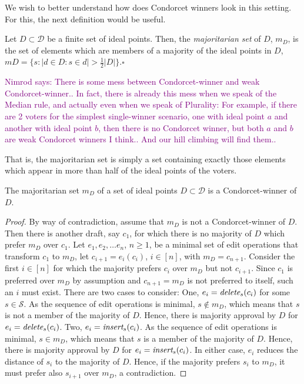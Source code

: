 \documentclass[sigconf]{aamas}  %
\newcommand{\nimrod}[1]{\textcolor{purple}{Nimrod says: #1}}
\newcommand{\qqed}{\hfill$\square$}
\newcommand{\calD}{\mathcal{D}}
\newcommand{\calS}{\mathcal{S}}
\newcommand{\iinsert}[1]{\emph{insert}_{#1}}
\newcommand{\ddelete}[1]{\emph{delete}_{#1}}
\begin{document}
We wish to better understand how does Condorcet winners look in this setting. For this, the next definition would be useful.

\begin{definition}\label{definition:majoritatian-set}
%
Let $D \subset \calD$ be a finite set of ideal points. Then, the \emph{majoritarian set} of $D$, $m_D$, is the set of elements which are members of a majority of the ideal points in $D$, $mD = \{s: |d \in D : s \in d| > \frac{1}{2}{|D|}\}$.\qqed
%
\end{definition}

\nimrod{There is some mess between Condorcet-winner and weak Condorcet-winner.. In fact, there is already this mess when we speak of the Median rule, and actually even when we speak of Plurality:
  For example, if there are 2 voters for the simplest single-winner scenario, one with ideal point $a$ and another with ideal point $b$, then there is no Condorcet winner, but both $a$ and $b$ are weak Condorcet winners I think.. And our hill climbing will find them..}

That is, the majoritarian set is simply a set containing exactly those elements which appear in more than half of the ideal points of the voters.

\begin{lemma}
\label{lemma:condorcet-majoritarian}
The majoritarian set $m_D$ of a set of ideal points $D \subset \calD$ is a Condorcet-winner of $D$.
\end{lemma}

\begin{proof}
%
By way of contradiction, assume that $m_D$ is not a Condorcet-winner of $D$.  Then there is another draft, say $c_1$, for which there is no majority of $D$ which prefer $m_D$ over $c_1$.  
Let $e_1, e_2, \ldots e_n$, $n \ge 1$, be a minimal set of edit operations that transform $c_1$ to $m_D$,  let $c_{i+1} = e_i(c_i)$, $ i \in [n]$, with $m_D = c_{n+1}$. Consider the first $i \in [n]$ for which the majority prefers $c_i$ over $m_D$ but not $c_{i+1}$.  Since $c_1$ is preferred over $m_D$ by assumption and $c_{n+1} = m_D$ is not preferred to itself, such an $i$ must exist.   
There are two cases to consider: One, $e_i = \ddelete{s}(c_i)$ for some $s \in \calS$.  As the sequence of edit operations is minimal,  $s \notin m_D$, which means that $s$ is not a member of the majority of $D$.  Hence, there is majority approval by $D$ for $e_i = \ddelete{s}(c_i)$.
Two, $e_i = \iinsert{s}(c_i)$.  As the sequence of edit operations is minimal,  $s \in m_D$, which means that $s$ is a member of the majority of $D$.  Hence, there is majority approval by $D$ for $e_i = \iinsert{s}(c_i)$.  In either case, $e_i$ reduces the distance of $s_i$ to the majority of $D$. Hence, if the majority prefers $s_i$ to $m_D$, it must prefer also $s_{i+1}$ over $m_D$, a contradiction.
%
\end{proof}
\end{document}
